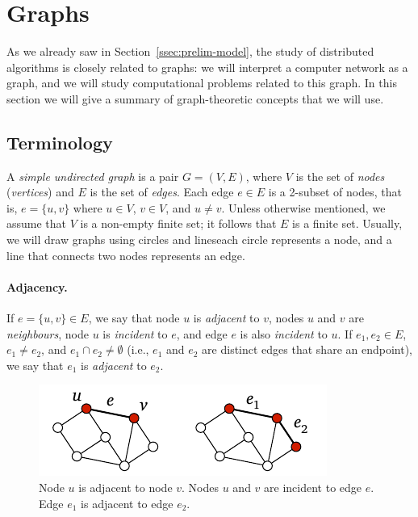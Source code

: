 \section{Graphs}\label{sec:graphs}

As we already saw in Section~\ref{ssec:prelim-model}, the study of distributed algorithms is closely related to graphs: we will interpret a computer network as a graph, and we will study computational problems related to this graph. In this section we will give a summary of graph-theoretic concepts that we will use.

\subsection{Terminology}

A \emph{simple undirected graph} is a pair $G = (V,E)$, where $V$ is the set of \emph{nodes} (\emph{vertices}) and $E$ is the set of \emph{edges}. Each edge $e \in E$ is a 2-subset of nodes, that is, $e = \{u,v\}$ where $u \in V$, $v \in V$, and $u \ne v$. Unless otherwise mentioned, we assume that $V$ is a non-empty finite set; it follows that $E$ is a finite set. Usually, we will draw graphs using circles and lines\mydash each circle represents a node, and a line that connects two nodes represents an edge.

\paragraph{Adjacency.}

If $e = \{u,v\} \in E$, we say that node $u$ is \emph{adjacent} to $v$, nodes $u$ and $v$ are \emph{neighbours}, node $u$ is \emph{incident} to $e$, and edge $e$ is also \emph{incident} to $u$. If $e_1, e_2 \in E$, $e_1 \ne e_2$, and $e_1 \cap e_2 \ne \emptyset$ (i.e., $e_1$ and $e_2$ are distinct edges that share an endpoint), we say that $e_1$ is \emph{adjacent} to $e_2$.
\begin{figure}
    \centering
    \includegraphics[page=\PGraph]{figs.pdf}
    \caption{Node $u$ is adjacent to node $v$. Nodes $u$ and $v$ are incident to edge $e$. Edge $e_1$ is adjacent to edge $e_2$.}\label{fig:graph}
\end{figure}

